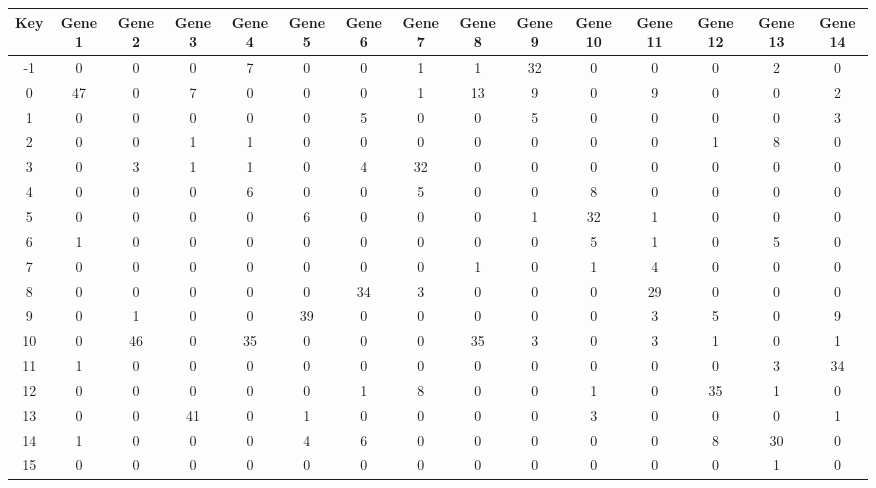 \begin{tabular}{|c|c|c|c|c|c|c|c|c|c|c|c|c|c|c|}
\hline
Key & Gene 1 & Gene 2 & Gene 3 & Gene 4 & Gene 5 & Gene 6 & Gene 7 & Gene 8 & Gene 9 & Gene 10 & Gene 11 & Gene 12 & Gene 13 & Gene 14 \\
\hline
-1 & 0 & 0 & 0 & 7 & 0 & 0 & 1 & 1 & 32 & 0 & 0 & 0 & 2 & 0 \\
0 & 47 & 0 & 7 & 0 & 0 & 0 & 1 & 13 & 9 & 0 & 9 & 0 & 0 & 2 \\
1 & 0 & 0 & 0 & 0 & 0 & 5 & 0 & 0 & 5 & 0 & 0 & 0 & 0 & 3 \\
2 & 0 & 0 & 1 & 1 & 0 & 0 & 0 & 0 & 0 & 0 & 0 & 1 & 8 & 0 \\
3 & 0 & 3 & 1 & 1 & 0 & 4 & 32 & 0 & 0 & 0 & 0 & 0 & 0 & 0 \\
4 & 0 & 0 & 0 & 6 & 0 & 0 & 5 & 0 & 0 & 8 & 0 & 0 & 0 & 0 \\
5 & 0 & 0 & 0 & 0 & 6 & 0 & 0 & 0 & 1 & 32 & 1 & 0 & 0 & 0 \\
6 & 1 & 0 & 0 & 0 & 0 & 0 & 0 & 0 & 0 & 5 & 1 & 0 & 5 & 0 \\
7 & 0 & 0 & 0 & 0 & 0 & 0 & 0 & 1 & 0 & 1 & 4 & 0 & 0 & 0 \\
8 & 0 & 0 & 0 & 0 & 0 & 34 & 3 & 0 & 0 & 0 & 29 & 0 & 0 & 0 \\
9 & 0 & 1 & 0 & 0 & 39 & 0 & 0 & 0 & 0 & 0 & 3 & 5 & 0 & 9 \\
10 & 0 & 46 & 0 & 35 & 0 & 0 & 0 & 35 & 3 & 0 & 3 & 1 & 0 & 1 \\
11 & 1 & 0 & 0 & 0 & 0 & 0 & 0 & 0 & 0 & 0 & 0 & 0 & 3 & 34 \\
12 & 0 & 0 & 0 & 0 & 0 & 1 & 8 & 0 & 0 & 1 & 0 & 35 & 1 & 0 \\
13 & 0 & 0 & 41 & 0 & 1 & 0 & 0 & 0 & 0 & 3 & 0 & 0 & 0 & 1 \\
14 & 1 & 0 & 0 & 0 & 4 & 6 & 0 & 0 & 0 & 0 & 0 & 8 & 30 & 0 \\
15 & 0 & 0 & 0 & 0 & 0 & 0 & 0 & 0 & 0 & 0 & 0 & 0 & 1 & 0 \\
\hline
\end{tabular}